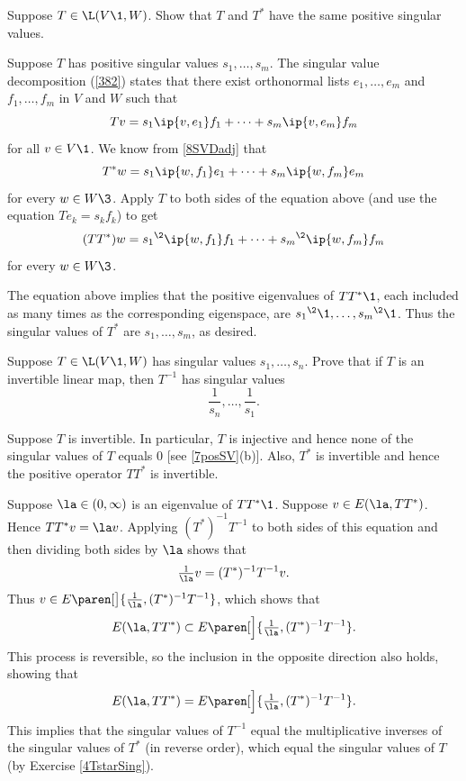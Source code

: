 \exercise
Suppose $T \in \L(V\1, W)$. Show that $T$ and $T^*$ have the same positive singular values. \label{4TstarSing}

\begin{Solution}
Suppose $T$ has positive singular values $s_1, \ldots, s_m$. The singular value decomposition (\ref{382}) states that there exist orthonormal lists $e_1, \ldots, e_m$ and $f_1, \ldots, f_m$ in $V$ and $W$ such that
\[
Tv = s_1 \ip{v, e_1} f_1 + \cdots + s_m \ip{v, e_m} f_m
\]
for all $v \in V\1$. We know from \ref{8SVDadj} that
\[
T^*w = s_1 \ip{w, f_1} e_1 + \dots + s_m \ip{w, f_m} e_m
\]
for every $w \in W\3$. Apply $T$ to both sides of the equation above (and use the equation $Te_k = s_k f_k$) to get
\[
(TT^*)w = {s_1}^{\2} \ip{w, f_1} f_1 + \dots + {s_m}^{\2} \ip{w, f_m} f_m
\]
for every $w \in W\3$.

The equation above implies that the positive eigenvalues of $TT^*\1$, each included as many times as the corresponding eigenspace, are ${s_1}^{\2}\1, \ldots, {s_m}^{\2}\1$. Thus the singular values of $T^*$ are $s_1, \ldots, s_m$, as desired.
\end{Solution}

\exercise
Suppose $T \in \L(V\1, W)$ has singular values $s_1, \ldots, s_n$. Prove that if $T$ is an  invertible linear map, then $T^{-1}$ has singular values\label{7singinv}
\[
\frac{1}{s_n}, \ldots, \frac{1}{s_1}.
\]
\exercisedisplayend

\begin{Solution}
Suppose $T$ is invertible. In particular, $T$ is injective and hence none of the singular values of $T$ equals $0$ [see \ref{7posSV}(b)]. Also, $T^*$ is invertible and hence the positive operator $TT^*$ is invertible.

Suppose $\la \in (0, \infty)$ is an eigenvalue of $TT^*\1$. Suppose $v \in E(\la, TT^*)$. Hence $TT^* v = \la v$. Applying $(T^*)^{-1}T^{-1}$ to both sides of this equation and then dividing both sides by $\la$ shows that
\[
\tfrac{1}{\la} v = (T^*)^{-1} T^{-1} v.
\]
Thus $v \in E\paren[\big]{ \frac{1}{\la}, (T^*)^{-1} T^{-1} }$, which shows that
\[
E(\la, TT^*) \subset E\paren[\Big]{ \tfrac{1}{\la}, (T^*)^{-1} T^{-1} }.
\]
This process is reversible, so the inclusion in the opposite direction also holds, showing that
\[
E(\la, TT^*) = E\paren[\Big]{ \tfrac{1}{\la}, (T^*)^{-1} T^{-1} }.
\]
This implies that the singular values of $T^{-1}$ equal the multiplicative inverses of the singular values of $T^*$ (in reverse order), which equal the singular values of $T$ (by Exercise \ref{4TstarSing}).
\end{Solution}

